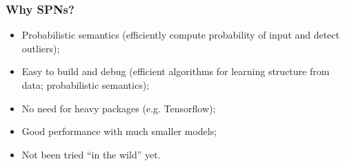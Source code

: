 \documentclass{beamer}
\begin{document}
\begin{frame}
  \frametitle{Why SPNs?}

  \begin{itemize}
    \item Probabilistic semantics (efficiently compute probability of input and detect outliers);
    \item Easy to build and debug (efficient algorithms for learning structure from data;
      probabilistic semantics);
    \item No need for heavy packages (e.g. Tensorflow);
    \item Good performance with much smaller models;
    \item Not been tried ``in the wild'' yet.
  \end{itemize}
\end{frame}
\end{document}
